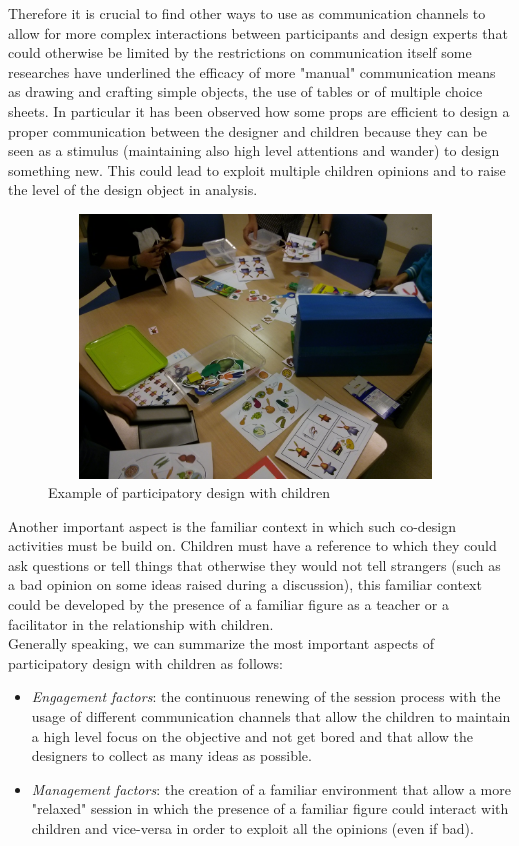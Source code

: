 Therefore it is crucial to find other ways to use as communication channels to allow for more complex interactions between participants and design experts that could otherwise be limited by the restrictions on communication itself \cite{PDC2} some researches have underlined the efficacy of more "manual" communication means as drawing and crafting simple objects, the use of tables or of multiple choice sheets. In particular it has been observed how some props are efficient to design a proper communication between the designer and children because they can be seen as a stimulus (maintaining also high level attentions and wander) to design something new. This could lead to exploit multiple children opinions and to raise the level of the design object in analysis.\\
\begin{figure}[H]
\centering
\includegraphics[width=11cm, height=7cm]{immagini/PDchildren.jpg}
\caption{Example of participatory design with children}\label{fig:pdchild}
\end{figure}
Another important aspect is the familiar context in which such co-design activities must be build on. Children must have a reference to which they could ask questions or tell things that otherwise they would not tell strangers (such as a bad opinion on some ideas raised during a discussion), this familiar context could be developed by the presence of a familiar figure as a teacher or a facilitator in the relationship with children.\\
Generally speaking, we can summarize the most important aspects of participatory design with children as follows:
\begin{itemize}
\item \textit{Engagement factors}: the continuous renewing of the session process with the usage of different communication channels that allow the children to maintain a high level focus on the objective and not get bored and that allow the designers to collect as many ideas as possible.
\item \textit{Management factors}: the creation of a familiar environment that allow a more "relaxed" session in which the presence of a familiar figure could interact with children and vice-versa in order to exploit all the opinions (even if bad).
\end{itemize}
